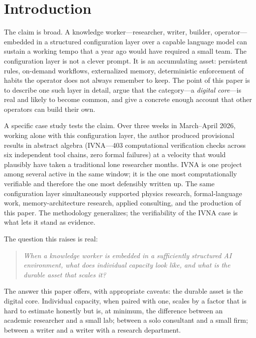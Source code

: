 \documentclass[12pt]{article}
\begin{document}
\section{Introduction}
\label{sec:intro}

The claim is broad. A knowledge worker---researcher, writer, builder, operator---embedded in a structured configuration layer over a capable language model can sustain a working tempo that a year ago would have required a small team. The configuration layer is not a clever prompt. It is an accumulating asset: persistent rules, on-demand workflows, externalized memory, deterministic enforcement of habits the operator does not always remember to keep. The point of this paper is to describe one such layer in detail, argue that the category---a \emph{digital core}---is real and likely to become common, and give a concrete enough account that other operators can build their own.

A specific case study tests the claim. Over three weeks in March--April 2026, working alone with this configuration layer, the author produced provisional results in abstract algebra (IVNA---403 computational verification checks across six independent tool chains, zero formal failures) at a velocity that would plausibly have taken a traditional lone researcher months. IVNA is one project among several active in the same window; it is the one most computationally verifiable and therefore the one most defensibly written up. The same configuration layer simultaneously supported physics research, formal-language work, memory-architecture research, applied consulting, and the production of this paper. The methodology generalizes; the verifiability of the IVNA case is what lets it stand as evidence.

The question this raises is real:

\begin{quote}
\textit{When a knowledge worker is embedded in a sufficiently structured AI environment, what does individual capacity look like, and what is the durable asset that scales it?}
\end{quote}

The answer this paper offers, with appropriate caveats: the durable asset is the digital core. Individual capacity, when paired with one, scales by a factor that is hard to estimate honestly but is, at minimum, the difference between an academic researcher and a small lab; between a solo consultant and a small firm; between a writer and a writer with a research department.
\end{document}
